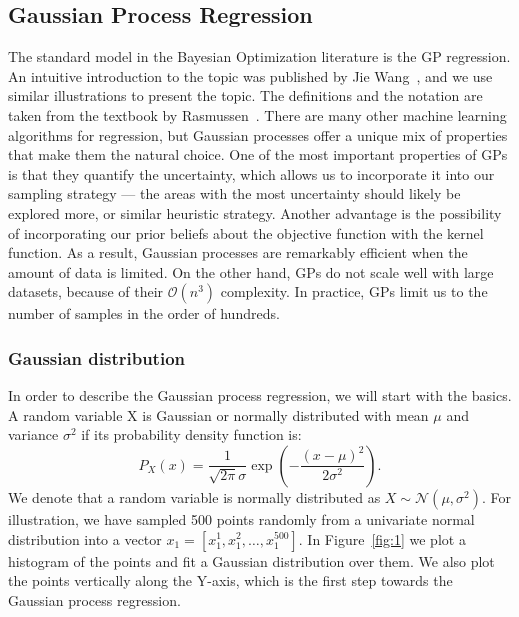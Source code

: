 \subsection{Gaussian Process Regression}
The standard model in the Bayesian Optimization literature is the GP regression. An intuitive introduction to the topic was published by Jie Wang~\cite{wang2023intuitive}, and we use similar illustrations to present the topic. The definitions and the notation are taken from the textbook by Rasmussen~\cite{rasmussen2006gaussian}. There are many other machine learning algorithms for regression, but Gaussian processes offer a unique mix of properties that make them the natural choice. One of the most important properties of GPs is that they quantify the uncertainty, which allows us to incorporate it into our sampling strategy --- the areas with the most uncertainty should likely be explored more, or similar heuristic strategy. Another advantage is the possibility of incorporating our prior beliefs about the objective function with the kernel function. As a result, Gaussian processes are remarkably efficient when the amount of data is limited. On the other hand, GPs do not scale well with large datasets, because of their $\mathcal{O}(n^3)$ complexity. In practice, GPs limit us to the number of samples in the order of hundreds.

\subsubsection{Gaussian distribution}
In order to describe the Gaussian process regression, we will start with the basics. A random variable X is Gaussian or normally distributed with mean $\mu$ and variance $\sigma^2$ if its probability density function is: \[ P_X(x) = \frac{1}{\sqrt{2\pi} \sigma} \exp\left(-\frac{(x-\mu)^2}{2 \sigma^2}\right). \] We denote that a random variable is normally distributed as $X \sim \mathcal{N}(\mu, \sigma^2)$. For illustration, we have sampled 500 points randomly from a univariate normal distribution into a vector $x_1 =[x_1^1,x_1^2, \ldots,x_1^{500}]$. In Figure~\ref{fig:1} we plot a histogram of the points and fit a Gaussian distribution over them. We also plot the points vertically along the Y-axis, which is the first step towards the Gaussian process regression.

